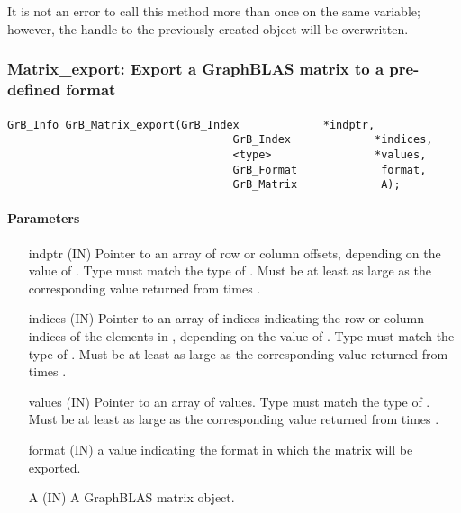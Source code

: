 It is not an error to call this method more than once on the same variable;  
however, the handle to the previously created object will be overwritten. 


\subsubsection{{\sf Matrix\_export}: Export a GraphBLAS matrix to a pre-defined format }
\label{Sec:Matrix_export}

\paragraph{\syntax}

\begin{Verbatim}[samepage=true]    
        GrB_Info GrB_Matrix_export(GrB_Index             *indptr,
                                   GrB_Index             *indices,
                                   <type>                *values,
                                   GrB_Format             format,
                                   GrB_Matrix             A);
\end{Verbatim}

\paragraph{Parameters}

\begin{itemize}[leftmargin=1.1in]
    \item[{\sf indptr}] ({\sf IN}) Pointer to an array of row or column offsets, depending on the value of .  Type must match the type of .  Must be at least as large as the corresponding value returned from  times .
    \item[{\sf indices}] ({\sf IN}) Pointer to an array of indices indicating the row or column indices of the elements in , depending on the value of .  Type must match the type of .  Must be at least as large as the corresponding value returned from  times .
    \item[{\sf values}] ({\sf IN}) Pointer to an array of values.  Type must match the type of .  Must be at least as large as the corresponding value returned from  times .
    \item[{\sf format}] ({\sf IN}) a value indicating the format in which the matrix will be exported.
    \item[{\sf A}]      ({\sf IN}) A GraphBLAS matrix object.
\end{itemize}

